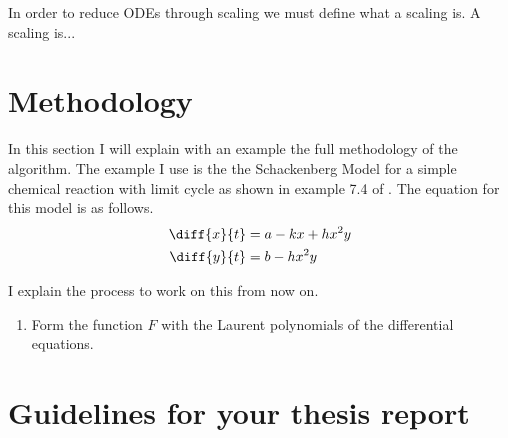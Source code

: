 \documentclass[oneside, a4paper, onecolumn, 11pt]{article}
\begin{document}
In order to reduce ODEs through scaling we must define what a scaling is. A scaling is...

\section{Methodology}

In this section I will explain with an example the full methodology of the algorithm. The example I use is the the Schackenberg Model for a simple chemical reaction with limit cycle as shown in example 7.4 of \cite{Hubert2013}. The equation for this model is as follows.
\begin{align*}
    \diff{x}{t}
     & = a - kx + hx^2y \\
    \diff{y}{t}
     & = b - h x^2 y
\end{align*}

I explain the process to  work on this from now on.

\begin{enumerate}[label=Step \arabic*:]
    \item Form the function \(F\) with the Laurent polynomials of the differential equations.
\end{enumerate}

\newpage

\section{Guidelines for your thesis report}
\end{document}
